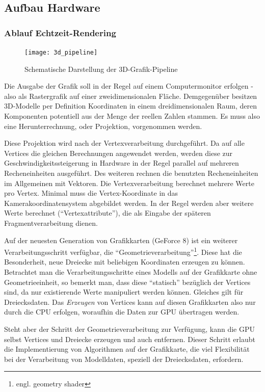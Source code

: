 \documentclass[twoside,a4paper,fleqn,12pt]{article}
\begin{document}
\subsection{Aufbau Hardware}

\subsubsection{Ablauf Echtzeit-Rendering}

\begin{figure}[h]
  \centering
  \texttt{[image: 3d\_pipeline]}
  \caption{Schematische Darstellung der 3D-Grafik-Pipeline}
  \label{fig:3d_pipeline}
\end{figure}

Die Ausgabe der Grafik soll in der Regel auf einem Computermonitor erfolgen - also als Rastergrafik auf einer zweidimensionalen Fläche.
Demgegenüber besitzen 3D-Modelle per Definition Koordinaten in einem dreidimensionalen Raum, deren Komponenten potentiell
aus der Menge der reellen Zahlen stammen. Es muss also eine Herunterrechnung, oder Projektion, vorgenommen werden. 

Diese Projektion wird nach der Vertexverarbeitung durchgeführt. Da auf alle Vertices die gleichen
Berechnungen angewendet werden, werden diese zur Geschwindigkeitssteigerung in Hardware in der Regel parallel 
auf mehreren Recheneinheiten ausgeführt. 
Des weiteren rechnen die benutzten Recheneinheiten im Allgemeinen mit Vektoren.
Die Vertexverarbeitung berechnet mehrere Werte pro Vertex. Minimal muss die Vertex-Koordinate in das Kamerakoordinatensystem
abgebildet werden. In der Regel werden aber weitere Werte berechnet ("`Vertexattribute"'), die als Eingabe der späteren Fragmentverarbeitung dienen.

Auf der neuesten Generation von Grafikkarten (GeForce 8) %
ist ein weiterer Verarbeitungsschritt verfügbar, die "`Geometrieverarbeitung"'\footnote{engl. geometry shader}. 
Diese hat die Besonderheit, neue Dreiecke
mit beliebigen Koordinaten erzeugen zu können. Betrachtet man die Verarbeitungsschritte eines Modells auf der
Grafikkarte ohne Geometrieeinheit, so bemerkt man, dass diese "`statisch"' bezüglich der Vertices sind, da nur existierende
Werte manipuliert werden können. Gleiches gilt für Dreiecksdaten. Das \emph{Erzeugen} von Vertices kann auf diesen Grafikkarten
also nur durch die CPU erfolgen, woraufhin die Daten zur GPU übertragen werden.

 Steht aber der Schritt der Geometrieverarbeitung zur Verfügung, kann die GPU selbst Vertices und Dreiecke erzeugen
und auch entfernen. Dieser Schritt erlaubt die Implementierung von Algorithmen auf der Grafikkarte, die viel 
Flexibilität bei der Verarbeitung von Modelldaten, speziell der Dreiecksdaten, erfordern.
\end{document}
